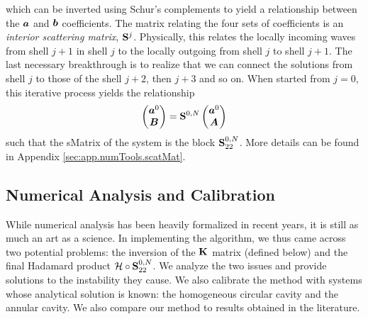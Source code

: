which can be inverted using Schur's complements  to yield a relationship between the 
$\boldsymbol{a}$ and $\boldsymbol{b}$ coefficients. The matrix relating
the four sets of coefficients is an \textit{interior scattering
matrix}, $\mathbf{S}^j$. Physically, this relates the locally 
incoming waves from shell $j+1$ in shell $j$ to the locally 
outgoing from shell $j$ to shell $j+1$. The last necessary
breakthrough is to realize that we can connect the solutions
from shell $j$ to those of the shell $j+2$, then $j+3$ and 
so on. When started from $j=0$, this iterative process yields
the relationship
  \begin{equation}
   \begin{pmatrix}\boldsymbol{a}^0\\\boldsymbol{B}\end{pmatrix} = \mathbf{S}^{0,N}\begin{pmatrix}\boldsymbol{a}^0\\\boldsymbol{A}\end{pmatrix}
  \end{equation}
such that the \gls{sMatrix} of the system is
the block $\mathbf{S}_{22}^{0,N}$. More details can be found
in Appendix \ref{sec:app.numTools.scatMat}. 
  
\subsection{Numerical Analysis and Calibration}
While numerical analysis has been heavily formalized in recent years, 
it is still as much an art as a science. In implementing the algorithm, 
we thus came across two potential problems: the inversion of the 
$\mathbf{K}$ matrix (defined below) and the final Hadamard product
$\mathcal{H}\circ\mathbf{S}^{0,N}_{22}$. We analyze the two issues
and provide solutions to the instability they cause. We also 
calibrate the method with systems whose analytical solution
is known: the homogeneous circular cavity and the annular cavity.
We also compare our method to results obtained in the literature. 

